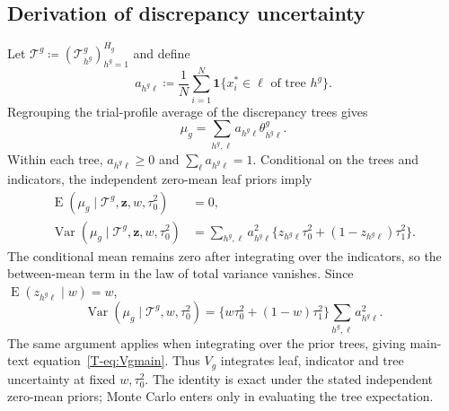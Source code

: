 \documentclass[11pt]{article}
\newcommand{\E}{\operatorname{E}}
\newcommand{\Var}{\operatorname{Var}}
\newcommand{\ind}{\mathbf{1}}
\theoremstyle{remark}\newtheorem{remark}{Remark}[section]
\providecommand{\DIFaddtex}[1]{{\protect\color{blue} \sf #1}} %
\providecommand{\DIFaddbegin}{} %
\providecommand{\DIFaddend}{} %
\providecommand{\DIFadd}[1]{\texorpdfstring{\DIFaddtex{#1}}{#1}} %
\begin{document}
\subsection{Derivation of discrepancy uncertainty}\label{sec:B.3}
Let $\mathcal T^g\coloneqq(\mathcal T_{h^g}^g)_{h^g=1}^{H_g}$ and define
 \DIFaddbegin \begin{equation}\label{eq:weights}
a_{h^g\ell}\coloneqq
\frac{1}{N}\sum_{i=1}^{N}
\ind\{x_i^*\in\ell\text{ of tree }h^g\}.
\end{equation}\DIFaddend 
Regrouping the  \DIFaddbegin \DIFadd{trial-profile }\DIFaddend average of the discrepancy trees gives
\begin{equation}
\mu_g=\sum_{h^g,\ell}a_{h^g\ell}\theta^g_{h^g\ell}.
\end{equation}
Within each tree, $a_{h^g\ell}\geq0$ and $\sum_\ell a_{h^g\ell}=1$. Conditional on the trees and indicators, the independent zero-mean leaf priors imply
\begin{equation}\label{eq:conditionalVg}
\begin{aligned}
\E(\mu_g\mid\mathcal T^g,\mathbf z,w,\tau_0^2)&=0,\\
\Var(\mu_g\mid\mathcal T^g,\mathbf z,w,\tau_0^2)
&=\sum_{h^g,\ell}a_{h^g\ell}^2
\{z_{h^g\ell}\tau_0^2+(1-z_{h^g\ell})\tau_1^2\}.
\end{aligned}
\end{equation}
The conditional mean remains zero after integrating over the indicators, so the between-mean term in the law of total variance vanishes. Since $\E(z_{h^g\ell}\mid w)=w$,
\[
\Var(\mu_g\mid\mathcal T^g,w,\tau_0^2)
=\{w\tau_0^2+(1-w)\tau_1^2\}
\sum_{h^g,\ell}a_{h^g\ell}^2.
\]
The same argument applies when integrating over the prior trees, giving main-text equation~\ref{T-eq:Vgmain}. Thus $V_g$ integrates leaf, indicator and tree uncertainty at fixed $w,\tau_0^2$. The identity is exact under the stated independent zero-mean priors; Monte Carlo enters only in evaluating the tree expectation.
\end{document}
